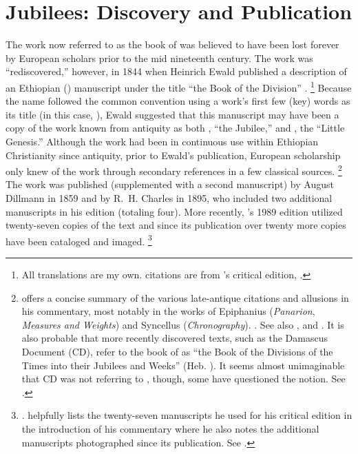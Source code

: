 \section{Jubilees: Discovery and Publication}
The work now referred to as the book of \jub was believed to have been lost forever by European scholars prior to the mid nineteenth century. The work was ``rediscovered,'' however, in 1844 when Heinrich Ewald published a description of an Ethiopian (\geez) manuscript under the title ``the Book of the Division'' .%
        \footnote{%
            All translations are my own. \geez citations are from \vanderkam's critical edition, 
            \cite*{vanderkam1989}.}
Because the name followed the common convention using a work's first few (key) words as its title (in this case, ), Ewald suggested that this manuscript may have been a copy of the work known from antiquity as both , ``the Jubilee,'' and , the ``Little Genesis.''\autocite[176--179]{ewald_zkm1844} Although the work had been in continuous use within Ethiopian Christianity since antiquity, prior to Ewald's publication, European scholarship only knew of the work through secondary references in a few classical sources.%
        \footnote{%
            \vanderkam offers a concise summary of the various late-antique citations and allusions in his commentary, most notably in the works of Epiphanius (\emph{Panarion}, \emph{Measures and Weights}) and Syncellus (\emph{Chronography}).
                \cite[1:10--14]{vanderkam2018}. See also 
                \cite{reed_kister-etal2015}, and 
                \cite{kreps_ch2018}.
            It is also probable that more recently discovered texts, such as the Damascus Document (CD), refer to the book of \jub as ``the Book of the Divisions of the Times into their Jubilees and Weeks'' (Heb. ). It seems almost unimaginable that CD was not referring to \jub, though, some have questioned the notion. See 
                \cite[242--248]{dimant_vanderkam-etal2006}.}
The work was published (supplemented with a second manuscript) by August Dillmann in 1859%
    \autocite{dillmann1859}
and by R.~H. Charles in 1895, who included two additional manuscripts in his edition (totaling four).%
    \autocite{charles1895}
More recently, \vanderkam's 1989 edition utilized twenty-seven copies of the text%
    \autocite[1:xiv--xvi]{vanderkam1989}
and since its publication over twenty more copies have been cataloged and imaged.%
        \footnote{%
                \cite{erho_bsoas2013}.
                \vanderkam helpfully lists the twenty-seven manuscripts he used for his critical edition in the introduction of his commentary where he also notes the additional manuscripts photographed since its publication. See 
                \cite[1:14--16]{vanderkam2018}.}


